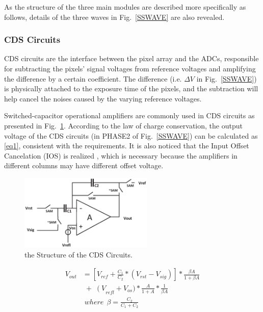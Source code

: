 As the structure of the three main modules are described more specifically as follows, details of the three waves in Fig.~\ref{SSWAVE} are also revealed.

\subsubsection{CDS Circuits}

CDS circuits are the interface between the pixel array and the ADCs, responsible for subtracting the pixels’ signal voltages from reference voltages and 
amplifying the difference by a certain coefficient. The difference (i.e. $\Delta{V}$ in Fig.~\ref{SSWAVE}) is physically attached to the exposure time of the pixels, 
and the subtraction will help cancel the noises caused by the varying reference voltages. 

Switched-capacitor operational amplifiers are commonly used in CDS circuits as presented in Fig.~\ref{CDS}. According to the law of charge conservation, 
the output voltage of the CDS circuits (in PHASE2 of Fig.~\ref{SSWAVE}) can be calculated as \eqref{eq1}, consistent with the requirements. It is also noticed that the Input Offset Cancelation (IOS) is realized \cite{razavi_design_1992}, 
which is necessary because the amplifiers in different columns may have different offset voltage.

\begin{figure}[htbp]
	\centerline{\includegraphics[width=2.5in]{./Figures/CDS.eps}}
	\caption{the Structure of the CDS Circuits.}
	\label{CDS}
\end{figure} 

\begin{equation}
	\begin{aligned}
		V_{out}&=\left[ V_{ref}+\frac{C_1}{C_2}\ast\left(V_{rst}-V_{sig}\right)\right]\ast\frac{\beta A}{1+\beta A}\\
		&\;{+}\;\left(V\right._{refl}+V_{os})\ast\frac{A}{1+A}\ast\frac{1}{\beta A}\\
		&\;where\ \ \beta=\frac{C_2}{C_1+C_2}
		\label{eq1}
	\end{aligned}
\end{equation}

